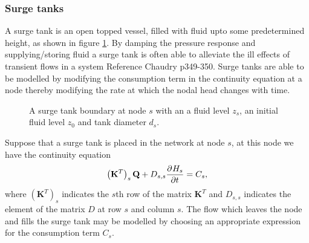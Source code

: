 \subsubsection{Surge tanks}

A surge tank is an open topped vessel, filled with fluid upto some predetermined height, as shown in figure \ref{fig:surge_tank_diagram}. By damping the pressure response and supplying/storing fluid a surge tank is often able to alleviate the ill effects of transient flows in a system {\color{red} Reference Chaudry p349-350}. Surge tanks are able to be modelled by modifying the consumption term in the continuity equation at a node thereby modifying the rate at which the nodal head changes with time. 

\begin{figure}
\centering
{} 
\caption{A surge tank boundary at node $s$ with an a fluid level $z_s$, an initial fluid level $z_0$ and tank diameter $d_s$.}
\label{fig:surge_tank_diagram}
\end{figure}

Suppose that a surge tank is placed in the network at node $s$, at this node we have the continuity equation
\begin{align}
\left( \mathbf{K}^T \right)_s \mathbf{Q} + D_{s,s} \frac{\partial^{} H_s}{\partial t^{}} = C_s,
\end{align}
where $\left( \mathbf{K}^T \right)_s$ indicates the $s$th row of the matrix $\mathbf{K}^T$ and $D_{s,s}$ indicates the element of the matrix $D$ at row $s$ and column $s$. The flow which leaves the node and fills the surge tank may be modelled by choosing an appropriate expression for the consumption term $C_s$. 

